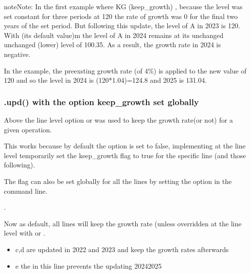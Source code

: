 \documentclass[letterpaper,10pt,english]{jupyterBook}
\begin{document}
\begin{sphinxadmonition}{note}{Note:}
\sphinxAtStartPar
In the first example where KG (keep\_growth) , because the level was set constant for three periods at 120 the rate of growth was 0 for the final two years of the set period.  But following this update, the level of A in 2023 is 120. With  (its default value)m the level of A in 2024 remains at its unchanged  unchanged (lower) level of 100.35. As a result, the growth rate in 2024 is negative.

\sphinxAtStartPar
In the  example, the pre\sphinxhyphen{}exsting growth rate (of 4\%) is applied to the new value of 120 and so the level in 2024 is (120*1.04)=124.8 and 2025 is 131.04.
\end{sphinxadmonition}


\subsubsection{.upd() with the option keep\_growth set globally}
\label{\detokenize{content/04_PythonEssentials/UpdateCommand:upd-with-the-option-keep-growth-set-globally}}
\sphinxAtStartPar
Above the line level option  or  was used to keep the growth rate(or not) for a given operation.

\sphinxAtStartPar
This works because by default the option  is set to false, implementing  at the line level temporarily set the keep\_growth flag to  true for the specific line (and those following).

\sphinxAtStartPar
The  flag can also be set globally for all the lines by setting the option in the command line.

\sphinxAtStartPar
{}.

\sphinxAtStartPar
Now as default, all lines will keep the growth rate (unless overridden at the line level with  or .
\begin{itemize}
\item {} 
\sphinxAtStartPar
c,d are updated in 2022 and 2023 and keep the growth rates afterwards

\item {} 
\sphinxAtStartPar
e the  in this line prevents the updating 2024\sphinxhyphen{}2025

\end{itemize}
\end{document}
